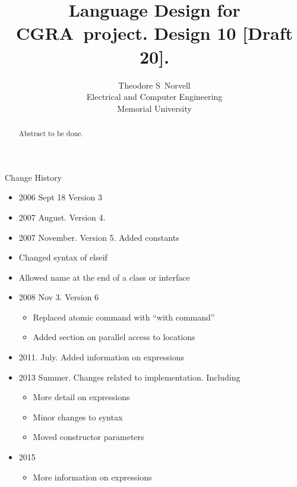\documentclass{article}%
\begin{document}
\title{Language Design for CGRA\ project. Design 10 [Draft 20].}
\author{Theodore S\ Norvell\\Electrical and Computer Engineering\\Memorial University}
\maketitle

\begin{abstract}
Abstract to be done.

\end{abstract}

Change History

\begin{itemize}
\item 2006 Sept 18 Version 3

\item 2007 August. Version 4.

\item 2007 November. Version 5. Added constants

\item Changed syntax of elseif

\item Allowed name at the end of a class or interface

\item 2008 Nov 3. Version 6

\begin{itemize}
\item Replaced atomic command with \textquotedblleft with
command\textquotedblright

\item Added section on parallel access to locations
\end{itemize}

\item 2011. July. Added information on expressions

\item 2013 Summer. Changes related to implementation. Including

\begin{itemize}
\item More detail on expressions

\item Minor changes to syntax

\item Moved constructor parameters
\end{itemize}

\item 2015

\begin{itemize}
\item More information on expressions
\end{itemize}
\end{itemize}
\end{document}
